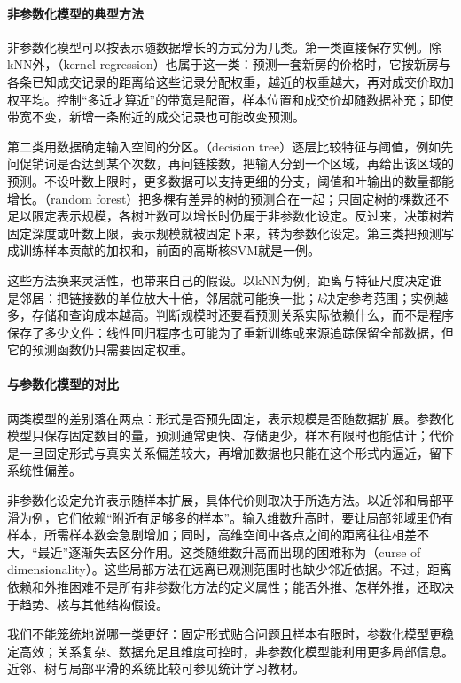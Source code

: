 \paragraph{非参数化模型的典型方法}

非参数化模型可以按表示随数据增长的方式分为几类。第一类直接保存实例。除kNN外，（kernel regression）也属于这一类：预测一套新房的价格时，它按新房与各条已知成交记录的距离给这些记录分配权重，越近的权重越大，再对成交价取加权平均。控制“多近才算近”的带宽是配置，样本位置和成交价却随数据补充；即使带宽不变，新增一条附近的成交记录也可能改变预测。

第二类用数据确定输入空间的分区。（decision tree）逐层比较特征与阈值，例如先问促销词是否达到某个次数，再问链接数，把输入分到一个区域，再给出该区域的预测。不设叶数上限时，更多数据可以支持更细的分支，阈值和叶输出的数量都能增长。（random forest）把多棵有差异的树的预测合在一起；只固定树的棵数还不足以限定表示规模，各树叶数可以增长时仍属于非参数化设定。反过来，决策树若固定深度或叶数上限，表示规模就被固定下来，转为参数化设定。第三类把预测写成训练样本贡献的加权和，前面的高斯核SVM就是一例。

这些方法换来灵活性，也带来自己的假设。以kNN为例，距离与特征尺度决定谁是邻居：把链接数的单位放大十倍，邻居就可能换一批；$k$决定参考范围；实例越多，存储和查询成本越高。判断规模时还要看预测关系实际依赖什么，而不是程序保存了多少文件：线性回归程序也可能为了重新训练或来源追踪保留全部数据，但它的预测函数仍只需要固定权重。

\paragraph{与参数化模型的对比}

两类模型的差别落在两点：形式是否预先固定，表示规模是否随数据扩展。参数化模型只保存固定数目的量，预测通常更快、存储更少，样本有限时也能估计；代价是一旦固定形式与真实关系偏差较大，再增加数据也只能在这个形式内逼近，留下系统性偏差。

非参数化设定允许表示随样本扩展，具体代价则取决于所选方法。以近邻和局部平滑为例，它们依赖“附近有足够多的样本”。输入维数升高时，要让局部邻域里仍有样本，所需样本数会急剧增加；同时，高维空间中各点之间的距离往往相差不大，“最近”逐渐失去区分作用。这类随维数升高而出现的困难称为（curse of dimensionality）。这些局部方法在远离已观测范围时也缺少邻近依据。不过，距离依赖和外推困难不是所有非参数化方法的定义属性；能否外推、怎样外推，还取决于趋势、核与其他结构假设。

我们不能笼统地说哪一类更好：固定形式贴合问题且样本有限时，参数化模型更稳定高效；关系复杂、数据充足且维度可控时，非参数化模型能利用更多局部信息。近邻、树与局部平滑的系统比较可参见统计学习教材。

